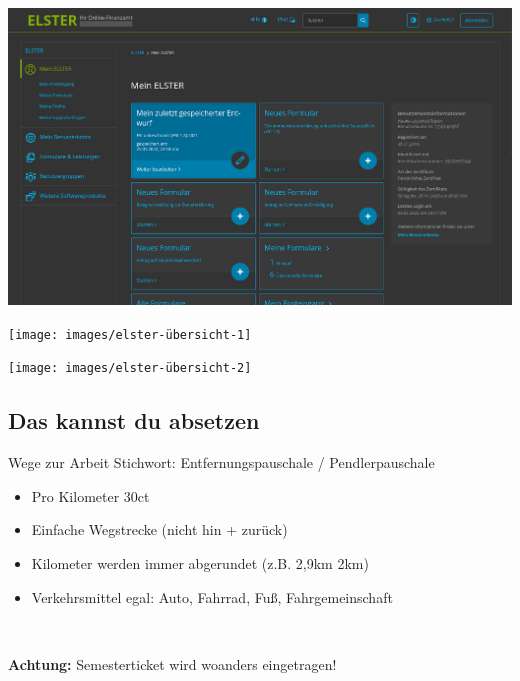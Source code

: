 \documentclass{beamer}
\newcommand{\n}{\hfill\\\vspace{0.25cm}}
\begin{document}
			\begin{frame}
				\begin{center}
					\vspace{-0.6cm}
					\hspace*{-0.91cm}
					\includegraphics[scale=0.24]{images/elster-1}
				\end{center}
			\end{frame}
		
			\begin{frame}
				\begin{center}
					\vspace{-0.6cm}
					\hspace*{-0.91cm}
					\texttt{[image: images/elster-übersicht-1]}
				\end{center}
			\end{frame}
		
			\begin{frame}
				\begin{center}
					\vspace{-0.6cm}
					\hspace*{-0.91cm}
					\texttt{[image: images/elster-übersicht-2]}
				\end{center}
			\end{frame}
		
		\subsection{Das kannst du absetzen}
		
			\begin{frame}{Wege zur Arbeit}
				Stichwort: Entfernungspauschale / Pendlerpauschale\n
				
				\begin{itemize}
					\item Pro Kilometer 30ct
					\item Einfache Wegstrecke (nicht hin + zurück)
					\item Kilometer werden immer abgerundet (z.B. 2,9km \textrightarrow 2km)
					\item Verkehrsmittel egal: Auto, Fahrrad, Fuß, Fahrgemeinschaft
				\end{itemize}\n
				
				\textbf{Achtung:} Semesterticket wird woanders eingetragen!
			\end{frame}
	
\end{document}
